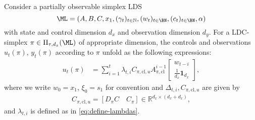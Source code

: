 \begin{lemma}
\label{lem:ldc-simplex-unfolding} 
Consider a partially observable simplex LDS 
$$\ML=(A, B, C, x_1, (\gamma_t)_{t\in\mathbb{N}}, (w_t)_{t\in\BN},(c_t)_{t\in\BN}, \alpha)$$
with state and control dimension $d_x$ and observation dimension $d_y$. For a LDC-simplex $\pi\in\Pi_{\tau,d_x}(\ML)$ of appropriate dimension, the controls and observations $u_t(\pi)$, $y_t(\pi)$ according to $\pi$ unfold as the following expressions:
\begin{align}
\label{eq:control-unfolding}
u_t(\pi)&=\sum_{i=1}^t \lambda_{t,i}C_{\pi,\mathrm{cl},u}A_{\pi,\mathrm{cl}}^{i-1}\begin{bmatrix}
w_{t-i}\\
\frac{1}{d_x}\mathbf{1}_{d_x}
\end{bmatrix},
\end{align}
where we write $w_0=x_1$, $\xi_0=s_1$ for convention and $\Delta_{t,i}, C_{\pi,\mathrm{cl},u}$ are given by
\begin{align*}
C_{\pi,\mathrm{cl},u} =[D_{\pi}C \quad  C_{\pi}]\in\mathbb{R}^{d_x\times(d_x+d_x)},
\end{align*}
and $\lambda_{t,i}$ is defined as in \cref{eq:define-lambdas}.
\end{lemma}
